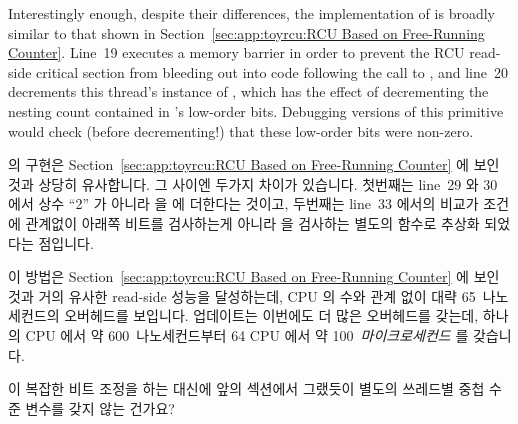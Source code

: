 Interestingly enough, despite their  differences,
the implementation of 
is broadly similar to that shown in
Section~\ref{sec:app:toyrcu:RCU Based on Free-Running Counter}.
Line~19 executes a memory barrier in order to prevent the RCU read-side
critical section from bleeding out into code following the call
to , and
line~20 decrements this thread's instance of ,
which has the effect of decrementing the nesting count contained in
's low-order bits.
Debugging versions of this primitive would check (before decrementing!)
that these low-order bits were non-zero.
\fi

 의 구현은
Section~\ref{sec:app:toyrcu:RCU Based on Free-Running Counter} 에 보인 것과 상당히
유사합니다.
그 사이엔 두가지 차이가 있습니다.
첫번째는 line~29 와 30 에서 상수 ``2'' 가 아니라  을
 에 더한다는 것이고, 두번째는 line~33 에서의 비교가 조건에
관계없이 아래쪽 비트를 검사하는게 아니라  을 검사하는
별도의 함수로 추상화 되었다는 점입니다.
\iffalse

The implementation of \co{synchronize_rcu()} is quite similar to
that shown in
Section~\ref{sec:app:toyrcu:RCU Based on Free-Running Counter}.
There are two differences.
The first is that lines~29 and~30 adds \co{RCU_GP_CTR_BOTTOM_BIT}
to the global \co{rcu_gp_ctr} instead of adding the constant ``2'',
and the second is that the comparison on line~33 has been abstracted
out to a separate function, where it checks the bit indicated
by \co{RCU_GP_CTR_BOTTOM_BIT} instead of unconditionally checking
the low-order bit.
\fi

이 방법은
Section~\ref{sec:app:toyrcu:RCU Based on Free-Running Counter} 에 보인 것과 거의 유사한
read-side 성능을 달성하는데,  CPU 의 수와 관계 없이 대략 65~나노세컨드의
오버헤드를 보입니다.
업데이트는 이번에도 더 많은 오버헤드를 갖는데, 하나의  CPU 에서 약
600~나노세컨드부터 64 CPU 에서 약 100~\emph{마이크로세컨드} 를 갖습니다.
\iffalse

This approach achieves read-side performance almost equal to that
shown in
Section~\ref{sec:app:toyrcu:RCU Based on Free-Running Counter}, incurring
roughly 65~nanoseconds of overhead regardless of the number of
\Power{5} CPUs.
Updates again incur more overhead, ranging from about 600~nanoseconds on
a single \Power{5} CPU to more than 100~\emph{microseconds} on 64
such CPUs.
\fi

\QuickQuiz{}
	이 복잡한 비트 조정을 하는 대신에 앞의 섹션에서 그랬듯이 별도의
	쓰레드별 중첩 수준 변수를 갖지 않는 건가요?
	\iffalse

